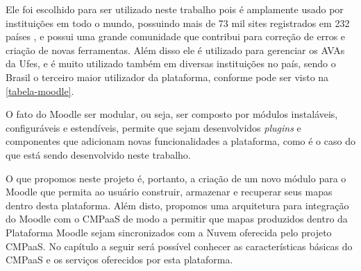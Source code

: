 \documentclass[
	12pt,				%
	openright,			%
	oneside,			%
	a4paper,			%
	english,			%
	french,				%
	spanish,			%
	brazil				%
	]{abntex2}
\begin{document}
Ele foi escolhido para ser utilizado neste trabalho pois é amplamente usado por instituições em todo o mundo, possuindo mais de 73 mil sites registrados em 232 países \cite{MoodleStat2016}, e possui uma grande comunidade que contribui para correção de erros e criação de novas ferramentas. Além disso ele é utilizado para gerenciar os AVAs da Ufes, e é muito utilizado também em diversas instituições no país, sendo o Brasil o terceiro maior utilizador da plataforma, conforme pode ser visto na \autoref{tabela-moodle}.



O fato do Moodle ser modular, ou seja, ser composto por módulos instaláveis, configuráveis e estendíveis,  permite que sejam desenvolvidos \textit{plugins} e componentes que adicionam novas funcionalidades a plataforma, como é o caso do que está sendo desenvolvido neste trabalho.

O que propomos neste projeto é, portanto, a criação de um novo módulo para o Moodle que permita ao usuário construir, armazenar e recuperar seus mapas dentro desta plataforma. Além disto, propomos uma arquitetura para integração do Moodle com o CMPaaS de modo a permitir que mapas produzidos dentro da Plataforma Moodle sejam sincronizados com a Nuvem oferecida pelo projeto CMPaaS. No capítulo a seguir será possível conhecer as características básicas do CMPaaS e os serviços oferecidos por esta plataforma.

\begin{table}[htb]
\end{table}
\end{document}
